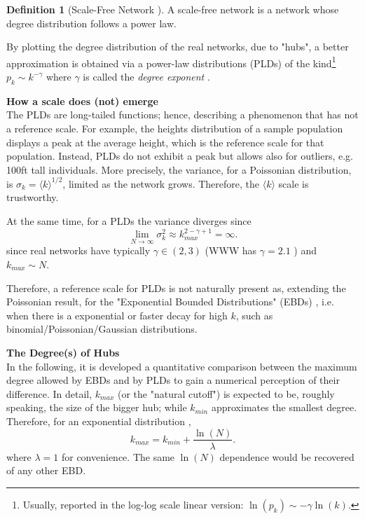\documentclass[a4paper,10pt]{book} %
\theoremstyle{definition}
\newtheorem{definition}{Definition}[section]
\begin{document}
\begin{definition}[Scale-Free Network \cite{Barabasi:1999_ScalRndNet}]
	A scale-free network is a network whose degree distribution follows a power law.
\end{definition}

By plotting the degree distribution of the real networks, due to "hubs", a better approximation is obtained via a power-law distributions (PLDs) of the kind\footnote{Usually, reported in the log-log scale linear version: $\ln(p_k) \sim -\gamma \ln(k)$.} $p_k \sim k^{-\gamma}$  where $\gamma$ is called the \textit{degree exponent} . 

{\large \textbf{How a scale does (not) emerge}} \\
The PLDs are long-tailed functions; hence, describing a phenomenon that has not a reference scale.
For example, the heights distribution of a sample population displays a peak at the average height, which is the reference scale for that population. Instead, PLDs do not exhibit a peak but allows also for outliers, e.g. 100ft tall individuals.
More precisely, the variance, for a Poissonian distribution, is $\sigma_k = \langle k \rangle ^ {1/2}$, limited as the network grows. Therefore, the $\langle k \rangle$ scale is trustworthy. 

At the same time, for a PLDs the variance diverges since \cite{barabasi::2016networkbook}	
\begin{equation}
	\lim_{N \to \infty} \sigma_k^2 \approx k_{max}^{2-\gamma+1} = \infty.
	\label{eq:sigma_SFnets}
\end{equation}
since real networks have typically $\gamma \in (2,3)$ (WWW has $\gamma =  2.1$ \cite{barabasi::2016networkbook}) and $k_{max} \sim N$. 

Therefore, a reference scale for PLDs is not naturally present as, extending the Poissonian result, for the "Exponential Bounded Distributions" (EBDs) \cite{barabasi::2016networkbook}, i.e. when there is a exponential or faster decay for high $k$, such as binomial/Poissonian/Gaussian distributions.

{\large \textbf{The Degree(s) of Hubs}} \\
In the following, it is developed a quantitative comparison between the maximum degree allowed by EBDs and by PLDs to gain a numerical perception of their difference.
In detail, $k_{max}$ (or the "natural cutoff") is expected to be, roughly speaking, the size of the bigger hub; while $k_{min}$ approximates the smallest degree.
Therefore, for an exponential distribution \cite{barabasi::2016networkbook}, 
\begin{equation}
	k_{max} = k_{min} + \frac{\ln(N)}{\lambda}.
	\label{eq:Expkmax_up}	
\end{equation}
where $\lambda = 1$ for convenience. The same $\ln(N)$ dependence would be recovered of any other EBD.
\end{document}
